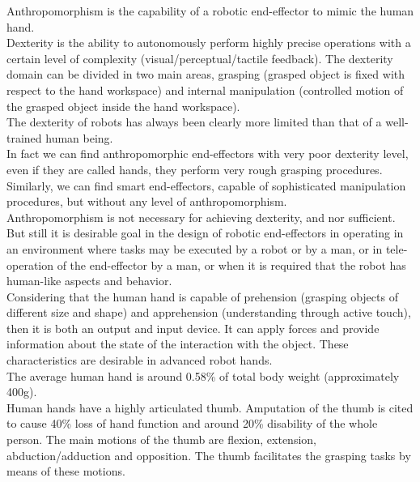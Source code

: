 \documentclass[a4paper, 10pt, conference]{ieeeconf}      %
\begin{document}
Anthropomorphism is the capability of a robotic end-effector to mimic the human hand.\\
Dexterity is the ability to autonomously perform highly precise operations with a certain level of complexity (visual/perceptual/tactile feedback).  The dexterity domain can be divided in two main areas, grasping (grasped object is fixed with respect to the hand workspace) and internal manipulation (controlled motion of the grasped object inside the hand workspace).\\
The dexterity of robots has always been clearly more limited than that of a well-trained human being.\\
In fact we can find anthropomorphic end-effectors with very poor dexterity level, even if they are called hands, they perform very rough grasping procedures. Similarly, we can find smart end-effectors, capable of sophisticated manipulation procedures, but without any level of anthropomorphism.\\
Anthropomorphism is not necessary for achieving dexterity, and nor sufficient. But still it is desirable goal in the design of robotic end-effectors in operating in an environment where tasks may be executed by a robot or by a man, or in tele-operation of the end-effector by a man, or when it is required that the robot has human-like aspects and behavior.\\
Considering that the human hand is capable of prehension (grasping objects of different size and shape) and apprehension (understanding through active touch), then it is both an output and input device. It can apply forces and provide information about the state of the interaction with the object. These characteristics are desirable in advanced robot hands.\\
The average human hand is around 0.58\% of total body weight (approximately 400g).\\
Human hands have a highly articulated thumb. Amputation of the thumb is cited to cause 40\% loss of hand function and around 20\% disability of the whole person. The main motions of the thumb are flexion, extension, abduction/adduction and opposition. The thumb facilitates the grasping tasks by means of these motions.\\
\end{document}
